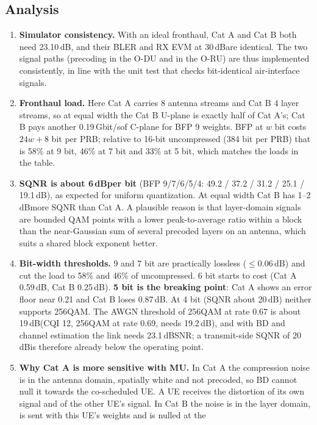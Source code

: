 \documentclass[11pt,a4paper]{article}
\newcommand{\dB}{\,dB}
\newcommand{\Gbps}{\,Gbit/s}
\begin{document}
\subsection{Analysis}

\begin{enumerate}
  \item \textbf{Simulator consistency.} With an ideal fronthaul, Cat A and Cat B both need 23.10\dB, and their BLER and RX EVM
        at 30\dB are identical. The two signal paths (precoding in the O-DU and in the O-RU) are thus implemented consistently,
        in line with the unit test that checks bit-identical air-interface signals.
  \item \textbf{Fronthaul load.} Here Cat A carries 8 antenna streams and Cat B 4 layer streams, so at equal width the Cat B
        U-plane is exactly half of Cat A's; Cat B pays another 0.19\Gbps of C-plane for BFP 9 weights. BFP at $w$ bit costs
        $24w+8$ bit per PRB; relative to 16-bit uncompressed (384 bit per PRB) that is 58\% at 9 bit, 46\% at 7 bit and 33\% at
        5 bit, which matches the loads in the table.
  \item \textbf{SQNR is about 6\dB per bit} (BFP 9/7/6/5/4: 49.2 / 37.2 / 31.2 / 25.1 / 19.1\dB), as expected for uniform
        quantization. At equal width Cat B has 1--2\dB more SQNR than Cat A. A plausible reason is that layer-domain signals are
        bounded QAM points with a lower peak-to-average ratio within a block than the near-Gaussian sum of several precoded
        layers on an antenna, which suits a shared block exponent better.
  \item \textbf{Bit-width thresholds.} 9 and 7 bit are practically lossless ($\le 0.06$\dB) and cut the load to 58\% and 46\% of
        uncompressed. 6 bit starts to cost (Cat A 0.59\dB, Cat B 0.25\dB). \textbf{5 bit is the breaking point}: Cat A shows an
        error floor near 0.21 and Cat B loses 0.87\dB. At 4 bit (SQNR about 20\dB) neither supports 256QAM. The AWGN threshold of
        256QAM at rate 0.67 is about 19\dB (CQI 12, 256QAM at rate 0.69, needs 19.2\dB), and with BD and channel estimation the
        link needs 23.1\dB SNR; a transmit-side SQNR of 20\dB is therefore already below the operating point.
  \item \textbf{Why Cat A is more sensitive with MU.} In Cat A the compression noise is in the antenna domain, spatially white
        and not precoded, so BD cannot null it towards the co-scheduled UE. A UE receives the distortion of its own signal and of
        the other UE's signal. In Cat B the noise is in the layer domain, is sent with this UE's weights and is nulled at the

\end{enumerate}
\end{document}
